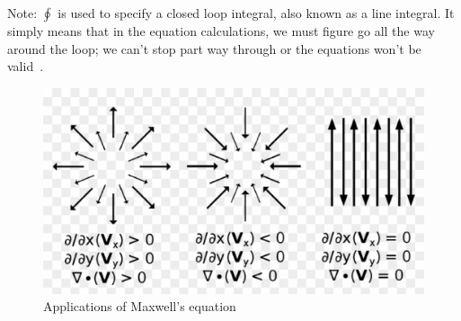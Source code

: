 Note: $\oint$ is used to specify a closed loop integral, also known as a line integral. It simply means that in the equation calculations, we must figure go all the way around the loop; we can't stop part  way through or the equations won't be valid~\cite{Yee1966302}.

\begin{figure}[!ht]
	\begin{center}
		\includegraphics[width=1\textwidth]{me20b024/maxwell_eq.eps}
  		\caption{Applications of Maxwell's equation}
		\label{fig:fig1}
	\end{center}
\end{figure}



